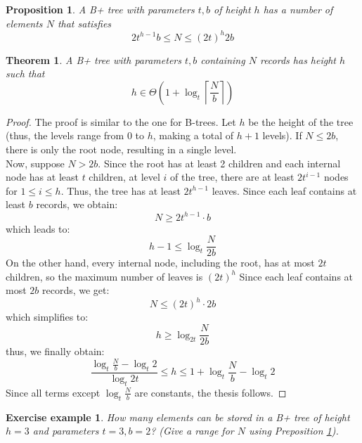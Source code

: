 \documentclass{report}
\newtheorem{prop}{Proposition}[chapter]
\newtheorem{teo}{Theorem}[chapter]
\newtheorem{es}{Exercise example}[chapter]
\begin{document}
\begin{prop}\label{prop:b+_tree}
    A B+ tree with parameters \( t,b \) of height \(h\) has a number of elements \(N\) that satisfies
    \begin{equation}
        2t^{h-1}b \leq N \leq (2t)^h 2b
    \end{equation}
\end{prop}
\begin{teo}
    A B+ tree with parameters \( t,b \) containing \( N \) records has height \(h\) such that
    \begin{equation}
        h \in \Theta \left( 1 + \log_t \left\lceil \frac{N}{b}\right\rceil  \right)
    \end{equation}
\end{teo}
\begin{proof}
    The proof is similar to the one for B-trees. Let \( h \) be the height of the tree (thus, the levels range from \( 0 \) to \( h \), making a total of \( h + 1 \) levels).  
    If \( N \leq 2b \), there is only the root node, resulting in a single level. \\
    Now, suppose \( N > 2b \). Since the root has at least 2 children and each internal node has at least \( t \) children,  
    at level \( i \) of the tree, there are at least \( 2t^{i-1} \) nodes for \( 1 \leq i \leq h \).  
    Thus, the tree has at least \( 2t^{h-1} \) leaves.  
    Since each leaf contains at least \( b \) records, we obtain:  
    \[
    N \geq 2t^{h-1} \cdot b
    \]
    which leads to:
    \[
    h - 1 \leq \log_t \frac{N}{2b}
    \]
    On the other hand, every internal node, including the root, has at most \( 2t \) children, so the maximum number of leaves is \((2t)^h\)
    Since each leaf contains at most \( 2b \) records, we get:  
    \[
    N \leq (2t)^h \cdot 2b
    \]
    which simplifies to:
    \[
    h \geq \log_{2t} \frac{N}{2b}
    \] 
    thus, we finally obtain:
    \[
    \frac{\log_t \frac{N}{b} - \log_t 2}{\log_t 2t} \leq h \leq 1 + \log_t \frac{N}{b} - \log_t 2
    \]
    Since all terms except \( \log_t \frac{N}{b} \) are constants, the thesis follows.
\end{proof}
\begin{es}
    How many elements can be stored in a B+ tree of height \(h=3\) and parameters \(t=3, b=2\)? (Give a range for \(N\) using Preposition \ref{prop:b+_tree}).
\end{es}
\end{document}
